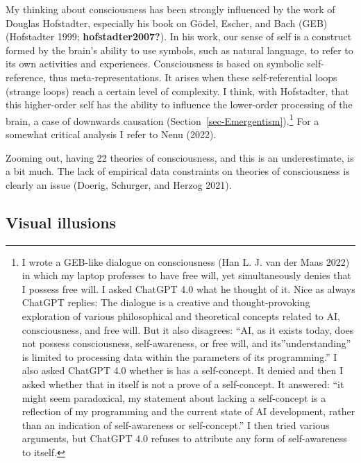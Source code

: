 \documentclass[
  a4paper,
  DIV=11,
  numbers=noendperiod]{scrreprt}
\begin{document}
My thinking about consciousness has been strongly influenced by the work
of Douglas Hofstadter, especially his book on Gödel, Escher, and Bach
(GEB) (Hofstadter 1999; \textbf{hofstadter2007?}). In his work, our
sense of self is a construct formed by the brain's ability to use
symbols, such as natural language, to refer to its own activities and
experiences. Consciousness is based on symbolic self-reference, thus
meta-representations. It arises when these self-referential loops
(strange loops) reach a certain level of complexity. I think, with
Hofstadter, that this higher-order self has the ability to influence the
lower-order processing of the brain, a case of downwards causation
(Section~\ref{sec-Emergentism}).\footnote{I wrote a GEB-like dialogue on
  consciousness (Han L. J. van der Maas 2022) in which my laptop
  professes to have free will, yet simultaneously denies that I possess
  free will. I asked ChatGPT 4.0 what he thought of it. Nice as always
  ChatGPT replies: The dialogue is a creative and thought-provoking
  exploration of various philosophical and theoretical concepts related
  to AI, consciousness, and free will. But it also disagrees: ``AI, as
  it exists today, does not possess consciousness, self-awareness, or
  free will, and its''understanding'' is limited to processing data
  within the parameters of its programming.'' I also asked ChatGPT 4.0
  whether is has a self-concept. It denied and then I asked whether that
  in itself is not a prove of a self-concept. It answered: ``it might
  seem paradoxical, my statement about lacking a self-concept is a
  reflection of my programming and the current state of AI development,
  rather than an indication of self-awareness or self-concept.'' I then
  tried various arguments, but ChatGPT 4.0 refuses to attribute any form
  of self-awareness to itself.} For a somewhat critical analysis I refer
to Nenu (2022).

Zooming out, having 22 theories of consciousness, and this is an
underestimate, is a bit much. The lack of empirical data constraints on
theories of consciousness is clearly an issue (Doerig, Schurger, and
Herzog 2021).

\hypertarget{sec-Visual-illusions}{%
\subsection{Visual illusions}\label{sec-Visual-illusions}}
\end{document}
